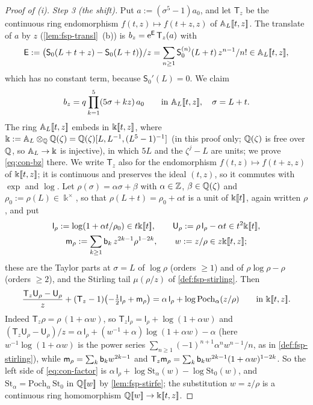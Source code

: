 \begin{proof}[Proof of (i)]
\emph{Step 3 (the shift).} Put $a:=(\sigma^5-1)a_0$, and let $\mathsf T_z$ be the continuous ring endomorphism $f(t,z)\mapsto f(t+z,z)$ of $\mathbb{A}_{L}[\![ t,z ]\!]$. The translate of $a$ by $z$ (\cref{lem:fsp-transl}~(b)) is $b_z=\mathrm{e}^{\mathsf E}\,\mathsf T_z(a)$ with
\[
\mathsf E:=\bigl(\mathsf S_0(L+t+z)-\mathsf S_0(L+t)\bigr)/z=\sum_{n\geq1}\mathsf S_0^{(n)}(L+t)\,z^{n-1}/n!\in\mathbb{A}_{L}[\![ t,z ]\!],
\]
which has no constant term, because $\mathsf S_0'(L)=0$. We claim
\begin{equation}
\label{eq:con-bz}
b_z=q\prod_{k=1}^5(5\sigma+kz)\,a_0\qquad\text{in }\mathbb{A}_{L}[\![ t,z ]\!],\quad\sigma=L+t .
\end{equation}
The ring $\mathbb{A}_{L}[\![ t,z ]\!]$ embeds in $\Bbbk[\![ t,z ]\!]$, where $\Bbbk:=\mathbb{A}_{L}\otimes_{\mathbb{Q}}\mathbb{Q}(\zeta)=\mathbb{Q}(\zeta)[L,L^{-1},(L^5-1)^{-1}]$ (in this proof only; $\mathbb{Q}(\zeta)$ is free over $\mathbb{Q}$, so $\mathbb{A}_{L}\to\Bbbk$ is injective), in which $5L$ and the $\zeta^j-L$ are units; we prove \eqref{eq:con-bz} there. We write $\mathsf T_z$ also for the endomorphism $f(t,z)\mapsto f(t+z,z)$ of $\Bbbk[\![ t,z ]\!]$; it is continuous and preserves the ideal $(t,z)$, so it commutes with $\exp$ and $\log$. Let $\rho(\sigma)=\alpha\sigma+\beta$ with $\alpha\in\mathbb{Z}$, $\beta\in\mathbb{Q}(\zeta)$ and $\rho_0:=\rho(L)\in\Bbbk^\times$, so that $\rho(L+t)=\rho_0+\alpha t$ is a unit of $\Bbbk[\![ t ]\!]$, again written $\rho$, and put
\begin{gather*}
\mathsf l_\rho:=\log(1+\alpha t/\rho_0)\in t\Bbbk[\![ t ]\!],\qquad\mathsf U_\rho:=\rho\,\mathsf l_\rho-\alpha t\in t^2\Bbbk[\![ t ]\!],\\
\mathsf m_\rho:=\sum_{k\geq1}\mathsf{b}_k\,z^{2k-1}\rho^{1-2k},\qquad w:=z/\rho\in z\Bbbk[\![ t,z ]\!];
\end{gather*}
these are the Taylor parts at $\sigma=L$ of $\log\rho$ (orders $\geq1$) and of $\rho\log\rho-\rho$ (orders $\geq2$), and the Stirling tail $\mu(\rho/z)$ of \cref{def:fsp-stirling}. Then
\begin{equation}
\label{eq:con-factor}
\frac{\mathsf T_z\mathsf U_\rho-\mathsf U_\rho}z+(\mathsf T_z-1)\bigl(-\tfrac12\mathsf l_\rho+\mathsf m_\rho\bigr)=\alpha\,\mathsf l_\rho+\log\mathrm{Poch}_\alpha(z/\rho)\qquad\text{in }\Bbbk[\![ t,z ]\!].
\end{equation}
Indeed $\mathsf T_z\rho=\rho\,(1+\alpha w)$, so $\mathsf T_z\mathsf l_\rho=\mathsf l_\rho+\log(1+\alpha w)$ and $(\mathsf T_z\mathsf U_\rho-\mathsf U_\rho)/z=\alpha\,\mathsf l_\rho+(w^{-1}+\alpha)\log(1+\alpha w)-\alpha$ (here $w^{-1}\log(1+\alpha w)$ is the power series $\sum_{n\geq1}(-1)^{n+1}\alpha^nw^{n-1}/n$, as in \cref{def:fsp-stirling}), while $\mathsf m_\rho=\sum_k\mathsf{b}_kw^{2k-1}$ and $\mathsf T_z\mathsf m_\rho=\sum_k\mathsf{b}_kw^{2k-1}(1+\alpha w)^{1-2k}$. So the left side of \eqref{eq:con-factor} is $\alpha\,\mathsf l_\rho+\log\mathrm{St}_\alpha(w)-\log\mathrm{St}_0(w)$, and $\mathrm{St}_\alpha=\mathrm{Poch}_\alpha\,\mathrm{St}_0$ in $\mathbb{Q}[\![ w ]\!]$ by \cref{lem:fsp-stirfe}; the substitution $w=z/\rho$ is a continuous ring homomorphism $\mathbb{Q}[\![ w ]\!]\to\Bbbk[\![ t,z ]\!]$.


\end{proof}
